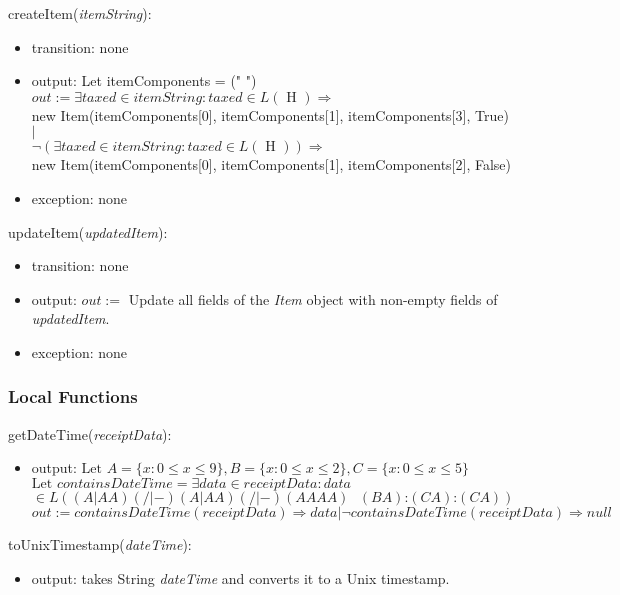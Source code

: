 \documentclass[12pt, titlepage]{article}
\begin{document}
\noindent createItem(\textit{itemString}):
\begin{itemize}
  \item transition: none
  \item output: Let itemComponents = (" ") \\
                $out := \exists taxed \in itemString : taxed \in L(\text{ H }) \Rightarrow$ \\
                new Item(itemComponents[0], itemComponents[1], itemComponents[3], True) $|$ \\
                $\neg(\exists taxed \in itemString : taxed \in L(\text{ H })) \Rightarrow$ \\
                new Item(itemComponents[0], itemComponents[1], itemComponents[2], False)
  \item exception: none
\end{itemize}

\noindent updateItem(\textit{updatedItem}):
\begin{itemize}
  \item transition: none
  \item output: $out :=$ Update all fields of the \textit{Item} object with non-empty fields of \textit{updatedItem}.
  \item exception: none
\end{itemize}

\subsubsection{Local Functions}

\noindent getDateTime(\textit{receiptData}):
\begin{itemize}
  \item output: $\text{Let } A=\{x : 0 \leq x \leq 9\}, B=\{x : 0 \leq x \leq 2\}, C=\{x : 0 \leq x \leq 5\}$ \\
                $\text{Let } containsDateTime=\exists data \in receiptData : data$\\ $\in L((A|AA)(/|-)(A|AA)(/|-)(AAAA)\text{ }(BA)\text{:}(CA)\text{:}(CA))$ \\
                $out := containsDateTime(receiptData) \Rightarrow data | \neg containsDateTime(receiptData) \Rightarrow null$
\end{itemize}

\noindent toUnixTimestamp(\textit{dateTime}):
\begin{itemize}
  \item output: takes String \textit{dateTime} and converts it to a Unix timestamp.
\end{itemize}
\end{document}
